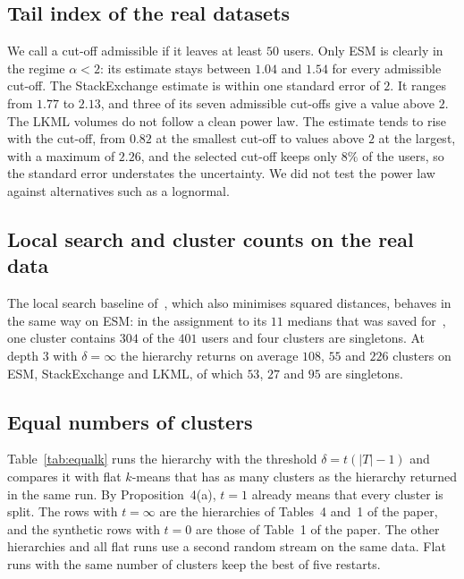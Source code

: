 \documentclass[11pt]{article}
\theoremstyle{remark}\newtheorem{remark}{Remark}\renewcommand{\theremark}{S\arabic{remark}}
\begin{document}
\subsection*{Tail index of the real datasets}
We call a cut-off admissible if it leaves at least $50$ users. Only ESM is clearly in the regime $\alpha<2$: its estimate stays between $1.04$ and $1.54$ for every admissible cut-off. The StackExchange estimate is within one standard error of $2$. It ranges from $1.77$ to $2.13$, and three of its seven admissible cut-offs give a value above $2$. The LKML volumes do not follow a clean power law. The estimate tends to rise with the cut-off, from $0.82$ at the smallest cut-off to values above $2$ at the largest, with a maximum of $2.26$, and the selected cut-off keeps only $8\%$ of the users, so the standard error understates the uncertainty. We did not test the power law against alternatives such as a lognormal.

\subsection*{Local search and cluster counts on the real data}
The local search baseline of~\cite{ocallaghan2002streaming}, which also minimises squared distances, behaves in the same way on ESM: in the assignment to its $11$ medians that was saved for~\cite{sinha2020hierarchical}, one cluster contains $304$ of the $401$ users and four clusters are singletons. At depth $3$ with $\delta=\infty$ the hierarchy returns on average $108$, $55$ and $226$ clusters on ESM, StackExchange and LKML, of which $53$, $27$ and $95$ are singletons.

\subsection*{Equal numbers of clusters}
Table~\ref{tab:equalk} runs the hierarchy with the threshold $\delta=t(|T|-1)$ and compares it with flat $k$-means that has as many clusters as the hierarchy returned in the same run. By Proposition~4(a), $t=1$ already means that every cluster is split. The rows with $t=\infty$ are the hierarchies of Tables~4 and~1 of the paper, and the synthetic rows with $t=0$ are those of Table~1 of the paper. The other hierarchies and all flat runs use a second random stream on the same data. Flat runs with the same number of clusters keep the best of five restarts.
\end{document}
